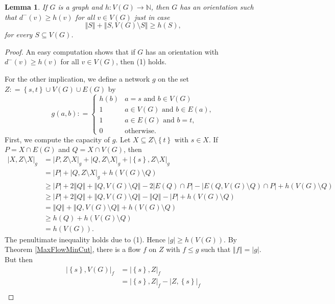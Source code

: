 \documentclass[openany]{tufte-book} %
\theoremstyle{plain}
\newtheorem{lemma}{Lemma}
\newcommand{\set}[1]{\left\{ #1 \right\}}
\newcommand{\card}[1]{\left|#1\right|}
\newcommand{\size}[1]{\left\Vert#1\right\Vert}
\newcommand{\func}[3]{#1\colon #2 \rightarrow #3}
\newcommand{\parens}[1]{\left( #1 \right)}
\newcommand{\DefinedAs}{\mathrel{\mathop:}=}
\newcommand{\IN}{\mathbb{N}}
\begin{document}
\begin{lemma}\label{InOrientations} If $G$ is a graph and $\func{h}{V(G)}{\IN}$,
then $G$ has an orientation such that $d^{-}(v)\ge h(v)$ for all $v\in V(G)$ just in case
\begin{equation}
\size{S}+\size{S,V(G)\setminus S}\ge h(S),
\end{equation}
for every $S \subseteq V(G)$.
\end{lemma}
\begin{proof}
An easy computation shows that if $G$ has an orientation with $d^{-}(v)\ge h(v)$ for all $v\in V(G)$, then (1) holds. 

For the other implication, we define a network $g$ on the set $Z \DefinedAs \set{s,t} \cup V(G) \cup E(G)$ by
\[g(a, b) \DefinedAs  \begin{cases} 
      h(b) & a = s \text{ and } b \in  V(G)\\
	  1 & a \in V(G) \text{ and } b \in E(a),\\
      1 & a \in E(G) \text{ and } b = t,\\
      0 & \text{otherwise} .
   \end{cases}
\]
First, we compute the capacity of $g$. Let $X \subseteq Z \setminus \set{t}$ with $s \in X$.  If $P = X \cap E(G)$ and $Q = X \cap V(G)$, then
\begin{align*}
\card{X, Z\setminus X}_g &= \card{P, Z\setminus X}_g + \card{Q, Z\setminus X}_g + \card{\set{s}, Z\setminus X}_g\\
&=\card{P} + \card{Q, Z\setminus X}_g + h\parens{V(G)\setminus Q}\\
&\ge\card{P} + 2\size{Q} + \size{Q, V(G)\setminus Q} - 2\card{E(Q) \cap P} - \card{E(Q, V(G)\setminus Q) \cap P} + h\parens{V(G)\setminus Q}\\
&\ge\card{P} + 2\size{Q} + \size{Q, V(G)\setminus Q} -\size{Q} - \card{P} + h\parens{V(G)\setminus Q}\\
&= \size{Q} + \size{Q, V(G)\setminus Q} + h\parens{V(G)\setminus Q}\\
&\ge h(Q) + h\parens{V(G)\setminus Q}\\
&= h(V(G)).
\end{align*}
The penultimate inequality holds due to (1).
Hence $\card{g} \ge h(V(G))$.  By Theorem \ref{MaxFlowMinCut}, there is a flow $f$ on $Z$ with $f \le g$ such that $\size{f} = \card{g}$.  But then
\begin{align*}
\card{\set{s}, V(G)}_f &=  \card{\set{s}, Z}_f \\
&= \card{\set{s}, Z}_f - \card{Z, \set{s}}_f\\

\end{align*}
\end{proof}
\end{document}
